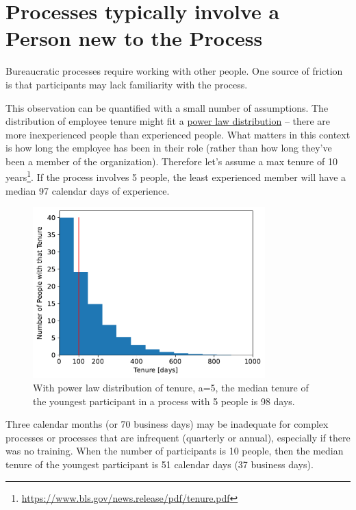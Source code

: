 \section{Processes typically involve a Person new to the Process}


Bureaucratic processes require working with other people. One source of friction is that participants may lack familiarity with the process. 

This observation can be quantified with a small number of assumptions. The distribution of employee tenure might fit a \href{https://en.wikipedia.org/wiki/Power_law}{power law distribution} -- there are more inexperienced people than experienced people. What matters in this context is how long the employee has been in their role (rather than how long they've been a member of the organization). Therefore let's assume a max tenure of 10 years\footnote{\href{https://www.bls.gov/news.release/pdf/tenure.pdf}{https://www.bls.gov/news.release/pdf/tenure.pdf}}. If the process involves 5 people, the least experienced member will have a median 97 calendar days of experience.

\begin{figure}[H]
    \centering
    \includegraphics[width=0.8\textwidth]{images/tenure_power_distribution_a5_with_max_tenure10_and_5_participants.pdf}
    \caption{With power law distribution of tenure, a=5,
the median tenure of the youngest participant
 in a process with 5 people is 98 days.}
    \label{fig:tenure-powerlaw-5-participants-tenure10}
\end{figure}


Three calendar months (or 70 business days) may be inadequate for complex processes or processes that are infrequent (quarterly or annual), especially if there was no training. When the number of participants is 10 people, then the median tenure of the youngest participant is 51 calendar days (37 business days).


